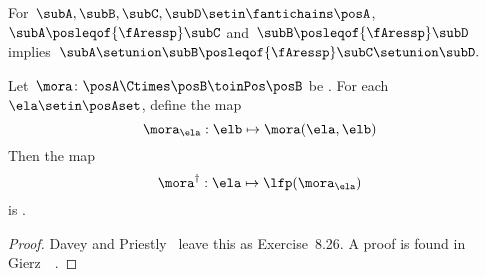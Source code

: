 \begin{lemma}
    \label{lem:antichain_union}
    For~$\subA,\subB,\subC,\subD\setin\fantichains\posA$,~$\subA\posleqof{\fAressp}\subC$
    and~$\subB\posleqof{\fAressp}\subD$ implies~$\subA\setunion \subB\posleqof{\fAressp}\subC\setunion \subD.
    $
\end{lemma}

\begin{lemma}
    \label{lem:dagger}
    Let~$\mora\colon\posA\Ctimes\posB\toinPos\posB$ be \scottcontinuous.
    For each~$\ela\setin\posAset$, define the map
    \begin{equation}
        \mora_{\ela}:\elb\mapsto \mora(\ela,\elb)
    \end{equation}
    Then the map
    \begin{equation}
        \mora^{\dagger}:\ela\mapsto\lfp(\mora_{\ela})
    \end{equation} is \scottcontinuous.
\end{lemma}
\begin{proof}
    Davey and Priestly~\cite{davey02} leave this as Exercise~8.26.
    A proof is found in Gierz~\etal~\cite[Exercise II-2.29]{gierz03continuous}.
\end{proof}

